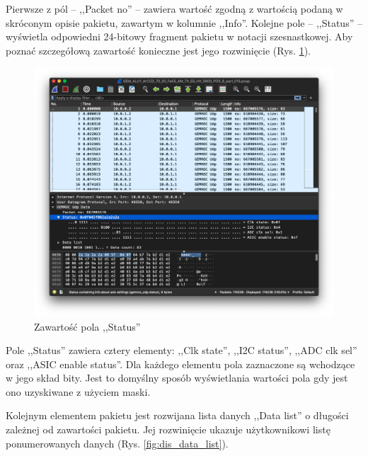 \documentclass[a4paper, 12pt, twoside, openright]{article}
\begin{document}
	Pierwsze z pól -- ,,Packet no'' -- zawiera wartość zgodną z wartością podaną w skróconym opisie pakietu, zawartym w kolumnie ,,Info''. Kolejne pole -- ,,Status'' --
	wyświetla odpowiedni 24-bitowy fragment pakietu w notacji szesnastkowej. Aby poznać szczegółową zawartość konieczne jest jego rozwinięcie (Rys. \ref{fig:dis_status}).

		\begin{figure}[H]
			\centering
				\includegraphics[width=1.0\textwidth]{img/screenshot_dissector_status.png}
			\caption{Zawartość pola ,,Status''}
			\label{fig:dis_status}
		\end{figure}

	Pole ,,Status'' zawiera cztery elementy: ,,Clk state'', ,,I2C status'', ,,ADC clk sel'' oraz ,,ASIC enable status''. Dla każdego elementu
	pola zaznaczone są wchodzące w jego skład bity. Jest to domyślny sposób wyświetlania wartości pola gdy jest ono uzyskiwane z użyciem maski.

	Kolejnym elementem pakietu jest rozwijana lista danych ,,Data list'' o długości zależnej od zawartości pakietu. Jej rozwinięcie ukazuje użytkownikowi
	listę ponumerowanych danych (Rys. \ref{fig:dis_data_list}).
\end{document}
